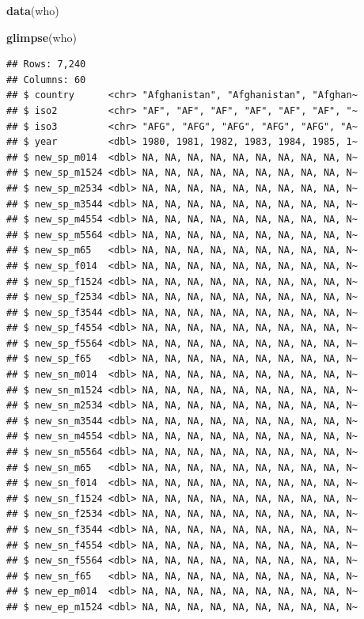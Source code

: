 \documentclass[
  11pt,
  oneside]{book}
\newenvironment{Shaded}{\begin{snugshade}}{\end{snugshade}}
\newcommand{\FunctionTok}[1]{\textcolor[rgb]{0.13,0.29,0.53}{\textbf{#1}}}
\newcommand{\NormalTok}[1]{#1}
\begin{document}
\begin{Shaded}
\begin{Highlighting}[]
\FunctionTok{data}\NormalTok{(who)}

\FunctionTok{glimpse}\NormalTok{(who)}
\end{Highlighting}
\end{Shaded}

\begin{verbatim}
## Rows: 7,240
## Columns: 60
## $ country      <chr> "Afghanistan", "Afghanistan", "Afghan~
## $ iso2         <chr> "AF", "AF", "AF", "AF", "AF", "AF", "~
## $ iso3         <chr> "AFG", "AFG", "AFG", "AFG", "AFG", "A~
## $ year         <dbl> 1980, 1981, 1982, 1983, 1984, 1985, 1~
## $ new_sp_m014  <dbl> NA, NA, NA, NA, NA, NA, NA, NA, NA, N~
## $ new_sp_m1524 <dbl> NA, NA, NA, NA, NA, NA, NA, NA, NA, N~
## $ new_sp_m2534 <dbl> NA, NA, NA, NA, NA, NA, NA, NA, NA, N~
## $ new_sp_m3544 <dbl> NA, NA, NA, NA, NA, NA, NA, NA, NA, N~
## $ new_sp_m4554 <dbl> NA, NA, NA, NA, NA, NA, NA, NA, NA, N~
## $ new_sp_m5564 <dbl> NA, NA, NA, NA, NA, NA, NA, NA, NA, N~
## $ new_sp_m65   <dbl> NA, NA, NA, NA, NA, NA, NA, NA, NA, N~
## $ new_sp_f014  <dbl> NA, NA, NA, NA, NA, NA, NA, NA, NA, N~
## $ new_sp_f1524 <dbl> NA, NA, NA, NA, NA, NA, NA, NA, NA, N~
## $ new_sp_f2534 <dbl> NA, NA, NA, NA, NA, NA, NA, NA, NA, N~
## $ new_sp_f3544 <dbl> NA, NA, NA, NA, NA, NA, NA, NA, NA, N~
## $ new_sp_f4554 <dbl> NA, NA, NA, NA, NA, NA, NA, NA, NA, N~
## $ new_sp_f5564 <dbl> NA, NA, NA, NA, NA, NA, NA, NA, NA, N~
## $ new_sp_f65   <dbl> NA, NA, NA, NA, NA, NA, NA, NA, NA, N~
## $ new_sn_m014  <dbl> NA, NA, NA, NA, NA, NA, NA, NA, NA, N~
## $ new_sn_m1524 <dbl> NA, NA, NA, NA, NA, NA, NA, NA, NA, N~
## $ new_sn_m2534 <dbl> NA, NA, NA, NA, NA, NA, NA, NA, NA, N~
## $ new_sn_m3544 <dbl> NA, NA, NA, NA, NA, NA, NA, NA, NA, N~
## $ new_sn_m4554 <dbl> NA, NA, NA, NA, NA, NA, NA, NA, NA, N~
## $ new_sn_m5564 <dbl> NA, NA, NA, NA, NA, NA, NA, NA, NA, N~
## $ new_sn_m65   <dbl> NA, NA, NA, NA, NA, NA, NA, NA, NA, N~
## $ new_sn_f014  <dbl> NA, NA, NA, NA, NA, NA, NA, NA, NA, N~
## $ new_sn_f1524 <dbl> NA, NA, NA, NA, NA, NA, NA, NA, NA, N~
## $ new_sn_f2534 <dbl> NA, NA, NA, NA, NA, NA, NA, NA, NA, N~
## $ new_sn_f3544 <dbl> NA, NA, NA, NA, NA, NA, NA, NA, NA, N~
## $ new_sn_f4554 <dbl> NA, NA, NA, NA, NA, NA, NA, NA, NA, N~
## $ new_sn_f5564 <dbl> NA, NA, NA, NA, NA, NA, NA, NA, NA, N~
## $ new_sn_f65   <dbl> NA, NA, NA, NA, NA, NA, NA, NA, NA, N~
## $ new_ep_m014  <dbl> NA, NA, NA, NA, NA, NA, NA, NA, NA, N~
## $ new_ep_m1524 <dbl> NA, NA, NA, NA, NA, NA, NA, NA, NA, N~

\end{verbatim}
\end{document}
